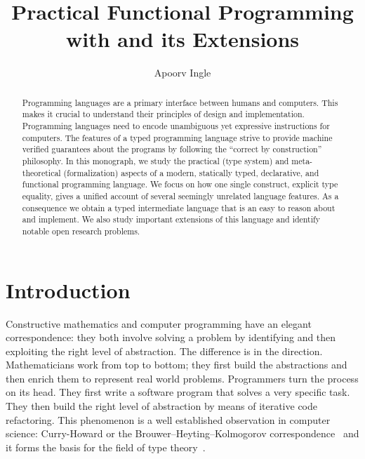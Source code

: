 \documentclass[screen,nonacm,manuscript,review]{acmart} %
\title{Practical Functional Programming with \SFC and its Extensions}
\author{Apoorv Ingle}
\affiliation{%
  \institution{University of Iowa} \department{Department of Computer Science} \streetaddress{McLean Hall} \city{Iowa City} \state{Iowa} \country{USA}}
\begin{document}
\begin{abstract}
  Programming languages are a primary interface between humans
  and computers. This makes it crucial to understand their principles of design
  and implementation. Programming languages need to encode unambiguous yet
  expressive instructions for computers. The
  features of a typed programming language strive to provide machine
  verified guarantees about the programs by following the  ``correct
  by construction'' philosophy. In this monograph, we study the practical
  (type system) and meta-theoretical (formalization) aspects of a
  modern, statically typed, declarative, and functional
  programming language. We focus on how one single construct,
  explicit type equality, gives a unified account of several seemingly
  unrelated language features. As a consequence we obtain a typed
  intermediate language that is an easy to
  reason about and implement. We also
  study important extensions of this language and identify notable open
  research problems.
\end{abstract}

\maketitle
\section{Introduction}\label{sec:introduction}
Constructive mathematics and computer programming have an elegant
correspondence: they both involve solving a problem by
identifying and then exploiting the right level of abstraction.
The difference is in the direction.
Mathematicians work from top to bottom; they first build the abstractions
and then enrich them to represent real world
problems. Programmers turn the process on its head.
They first write a software program that solves a very specific
task. They then build the right level of abstraction by means of
iterative code refactoring. This phenomenon is a well established
observation in computer science: Curry-Howard or the
Brouwer–Heyting–Kolmogorov correspondence~\cite{wadler_propositions_2015,han_deep_2023}
and it forms the basis for the field of type
theory~\cite{barendregt_lambda_2013,hottbook_2013,nordstrom_programming_1990}.
\end{document}
